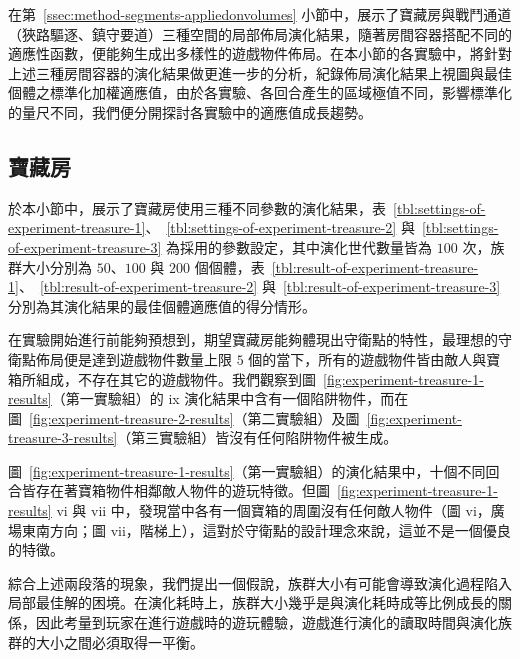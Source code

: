 在第~\ref{ssec:method-segments-appliedonvolumes} 小節中，展示了寶藏房與戰鬥通道（狹路驅逐、鎮守要道）三種空間的局部佈局演化結果，隨著房間容器搭配不同的適應性函數，便能夠生成出多樣性的遊戲物件佈局。在本小節的各實驗中，將針對上述三種房間容器的演化結果做更進一步的分析，紀錄佈局演化結果上視圖與最佳個體之標準化加權適應值，由於各實驗、各回合產生的區域極值不同，影響標準化的量尺不同，我們便分開探討各實驗中的適應值成長趨勢。


\subsection{寶藏房}
\label{ssec:experiment-results-treasure}

於本小節中，展示了寶藏房使用三種不同參數的演化結果，表~\ref{tbl:settings-of-experiment-treasure-1}、~\ref{tbl:settings-of-experiment-treasure-2} 與~\ref{tbl:settings-of-experiment-treasure-3} 為採用的參數設定，其中演化世代數量皆為 $100$ 次，族群大小分別為 $50$、$100$ 與 $200$ 個個體，表~\ref{tbl:result-of-experiment-treasure-1}、~\ref{tbl:result-of-experiment-treasure-2} 與~\ref{tbl:result-of-experiment-treasure-3} 分別為其演化結果的最佳個體適應值的得分情形。

在實驗開始進行前能夠預想到，期望寶藏房能夠體現出守衛點的特性，最理想的守衛點佈局便是達到遊戲物件數量上限 $5$ 個的當下，所有的遊戲物件皆由敵人與寶箱所組成，不存在其它的遊戲物件。我們觀察到圖~\ref{fig:experiment-treasure-1-results}（第一實驗組）的 ix 演化結果中含有一個陷阱物件，而在圖~\ref{fig:experiment-treasure-2-results}（第二實驗組）及圖~\ref{fig:experiment-treasure-3-results}（第三實驗組）皆沒有任何陷阱物件被生成。

圖~\ref{fig:experiment-treasure-1-results}（第一實驗組）的演化結果中，十個不同回合皆存在著寶箱物件相鄰敵人物件的遊玩特徵。但圖~\ref{fig:experiment-treasure-1-results} vi 與 vii 中，發現當中各有一個寶箱的周圍沒有任何敵人物件（圖 vi，廣場東南方向；圖 vii，階梯上），這對於守衛點的設計理念來說，這並不是一個優良的特徵。

綜合上述兩段落的現象，我們提出一個假說，族群大小有可能會導致演化過程陷入局部最佳解的困境。在演化耗時上，族群大小幾乎是與演化耗時成等比例成長的關係，因此考量到玩家在進行遊戲時的遊玩體驗，遊戲進行演化的讀取時間與演化族群的大小之間必須取得一平衡。


